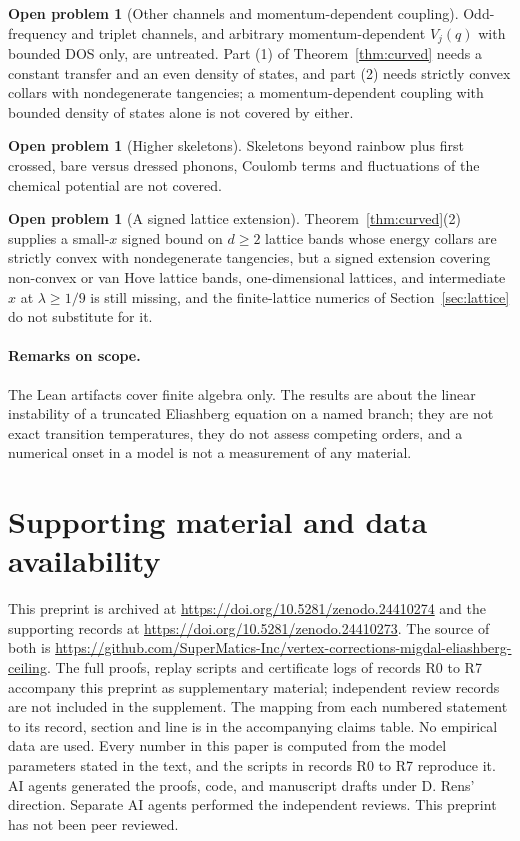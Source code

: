 \documentclass[11pt]{article}
\theoremstyle{definition}
\newtheorem{problem}[theorem]{Open problem}
\theoremstyle{remark}
\newcommand{\MSPAPERDOI}{10.5281/zenodo.24410274}
\newcommand{\MSSUPPDOI}{10.5281/zenodo.24410273}
\newcommand{\MSREPOURL}{https://github.com/SuperMatics-Inc/vertex-corrections-migdal-eliashberg-ceiling}
\begin{document}
\begin{problem}[Other channels and momentum-dependent coupling]\label{prob:channels}
Odd-frequency and triplet channels, and arbitrary momentum-dependent $V_j(q)$ with bounded DOS only, are untreated. Part (1) of Theorem~\ref{thm:curved} needs a constant transfer and an even density of states, and part (2) needs strictly convex collars with nondegenerate tangencies; a momentum-dependent coupling with bounded density of states alone is not covered by either.
\end{problem}

\begin{problem}[Higher skeletons]\label{prob:higher}
Skeletons beyond rainbow plus first crossed, bare versus dressed phonons, Coulomb terms and fluctuations of the chemical potential are not covered.
\end{problem}

\begin{problem}[A signed lattice extension]\label{prob:lattice}
Theorem~\ref{thm:curved}(2) supplies a small-$x$ signed bound on $d\ge2$ lattice bands whose energy collars are strictly convex with nondegenerate tangencies, but a signed extension covering non-convex or van Hove lattice bands, one-dimensional lattices, and intermediate $x$ at $\lambda\ge1/9$ is still missing, and the finite-lattice numerics of Section~\ref{sec:lattice} do not substitute for it.
\end{problem}

\paragraph{Remarks on scope.} The Lean artifacts cover finite algebra only. The results are about the linear instability of a truncated Eliashberg equation on a named branch; they are not exact transition temperatures, they do not assess competing orders, and a numerical onset in a model is not a measurement of any material.

\section*{Supporting material and data availability}
This preprint is archived at \url{https://doi.org/\MSPAPERDOI} and the supporting records at \url{https://doi.org/\MSSUPPDOI}. The source of both is \url{\MSREPOURL}.
The full proofs, replay scripts and certificate logs of records R0 to R7 accompany this preprint as supplementary material; independent review records are not included in the supplement. The mapping from each numbered statement to its record, section and line is in the accompanying claims table. No empirical data are used. Every number in this paper is computed from the model parameters stated in the text, and the scripts in records R0 to R7 reproduce it. AI agents generated the proofs, code, and manuscript drafts under D. Rens' direction. Separate AI agents performed the independent reviews. This preprint has not been peer reviewed.



\end{document}
